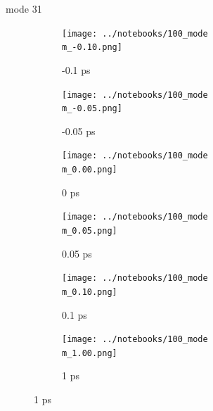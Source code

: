 \documentclass{beamer}
\newcommand\w{0.32}
\begin{document}
\renewcommand\m{31}
\begin{frame}{mode \m}
	\begin{figure}
		\centering
		\begin{subfigure}[b]{\w\textwidth}
			\centering
			\texttt{[image: ../notebooks/100\_mode\\m\_-0.10.png]}
			\caption{-0.1 ps}
		\end{subfigure}
		\begin{subfigure}[b]{\w\textwidth}
			\centering
			\texttt{[image: ../notebooks/100\_mode\\m\_-0.05.png]}
			\caption{-0.05 ps}
		\end{subfigure}
		\begin{subfigure}[b]{\w\textwidth}
			\centering
			\texttt{[image: ../notebooks/100\_mode\\m\_0.00.png]}
			\caption{0 ps}
		\end{subfigure}
		\begin{subfigure}[b]{\w\textwidth}
			\centering
			\texttt{[image: ../notebooks/100\_mode\\m\_0.05.png]}
			\caption{0.05 ps}
		\end{subfigure}
		\begin{subfigure}[b]{\w\textwidth}
			\centering
			\texttt{[image: ../notebooks/100\_mode\\m\_0.10.png]}
			\caption{0.1 ps}
		\end{subfigure}
		\begin{subfigure}[b]{\w\textwidth}
			\centering
			\texttt{[image: ../notebooks/100\_mode\\m\_1.00.png]}
			\caption{1 ps}
		\end{subfigure}
	\end{figure}
\end{frame}
\end{document}

